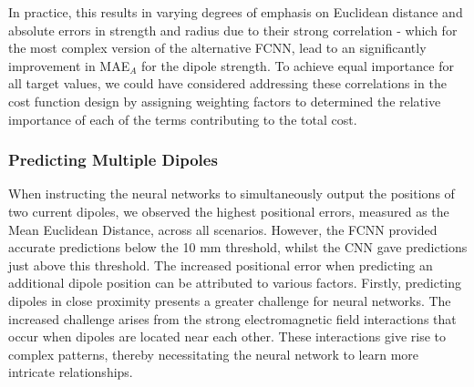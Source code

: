 \documentclass[a4paper, UKenglish, 11pt]{uiomaster}
\begin{document}
In practice, this results in varying degrees of emphasis on Euclidean distance and absolute errors in strength and radius due to their strong correlation - which for the most complex version of the alternative FCNN, lead to an significantly improvement in MAE$_{A}$ for the dipole strength. To achieve equal importance for all target values, we could have considered addressing these correlations in the cost function design by assigning weighting factors to determined the relative importance of each of the terms contributing to the total cost.


\subsubsection{Predicting Multiple Dipoles}
When instructing the neural networks to simultaneously output the positions of two current dipoles, we observed the highest positional errors, measured as the Mean Euclidean Distance, across all scenarios. However, the FCNN provided accurate predictions below the 10 mm threshold, whilst the CNN gave predictions just above this threshold.
The increased positional error when predicting an additional dipole position can be attributed to various factors. Firstly, predicting dipoles in close proximity presents a greater challenge for neural networks. The increased challenge arises from the strong electromagnetic field interactions that occur when dipoles are located near each other.  These interactions give rise to complex patterns, thereby necessitating the neural network to learn more intricate relationships.
\end{document}
